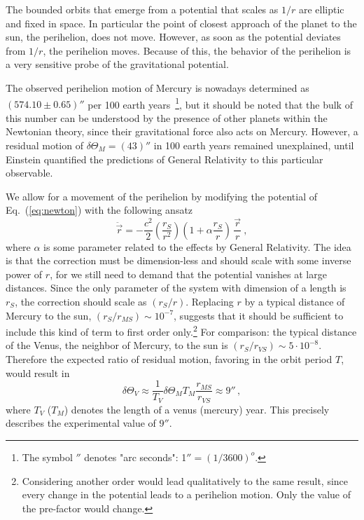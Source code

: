 \documentclass[12pt, UK english]{iopart}
\begin{document}
The bounded orbits that emerge from a potential that scales as $1/r$ are elliptic and fixed in space.
In particular the point of closest approach of the planet to the sun, the perihelion, does not move.
However, as soon as the potential deviates from $1/r$, the perihelion moves.
Because of this, the behavior of the perihelion is a very sensitive probe of the gravitational potential. 

The observed perihelion motion of Mercury is nowadays determined as $(574.10\pm 0.65)''$ per
100 earth years~\footnote{The symbol $''$ denotes "arc seconds": 1$''=(1/3600)^o$. }, but it should be noted that the bulk of this number
can be understood by the presence of other planets within the Newtonian theory, since
their gravitational force also acts on Mercury. However, a
residual motion of $\delta \Theta_M = (43)''$ in 100 earth years remained unexplained, until Einstein quantified the
predictions of General Relativity to this particular observable. 

We allow for a movement of the perihelion by modifying the potential of Eq.~(\ref{eq:newton}) with the following ansatz
\begin{equation}
\ddot{\vec r} = - \frac{c^2}{2}\left(\frac{r_S}{r^2}\right)\left(1+\alpha\frac{r_S}{r}\right) \, \frac{\vec{r}}{r} \ ,
\label{eq:newton_art}
\end{equation}
where $\alpha$ is some parameter related to the effects by General Relativity.
The idea is that the correction must be dimension-less and should scale with some inverse power of $r$, for we still need to demand that the potential vanishes at large distances.
Since the only parameter of the system with dimension of a length is $r_S$, the correction should scale as $(r_S/r)$.
Replacing $r$ by a typical distance of Mercury to the sun, $(r_S/r_{MS})\sim 10^{-7}$, suggests that it should be sufficient to include this kind of term to first order only.\footnote{Considering another order would lead qualitatively to the same result, since every change in the potential leads to a perihelion motion. Only the value of the pre-factor would change.}
For comparison: the typical distance of the Venus, the neighbor of Mercury, to the sun is $(r_S/r_{VS}) \sim 5 \cdot 10^{-8}$.
Therefore the expected ratio of residual motion, favoring in the orbit period $T$, would result in
\begin{equation}
	\delta \Theta_V \approx \frac{1}{T_V} \delta \Theta_M T_M \frac{r_{MS}}{r_{VS}} \approx 9'' \, ,
\end{equation}
where $T_V$ ($T_M$) denotes the length of a venus (mercury) year. This precisely describes the experimental value of $9''$.
\end{document}
